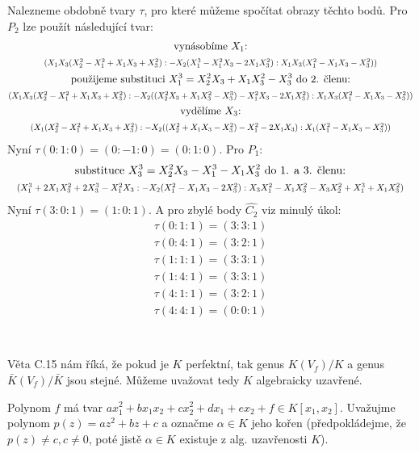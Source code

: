 \documentclass[12pt, a4paper]{article}
\begin{document}
\begin{enumerate}
    Nalezneme obdobně tvary $\tau$, pro které můžeme spočítat obrazy těchto bodů. Pro $P_2$ lze použít následující tvar:
    \begin{gather*}
    \text{vynásobíme $X_1$:}\\
    \scalebox{.8}{$(X_1X_3(X_2^2-X_1^2+X_1X_3+X_3^2) : -X_2(X_1^3-X_1^2X_3-2X_1X_3^2) : X_1X_3(X_1^2-X_1X_3-X_3^2))$}\\
    \text{použijeme substituci $X_1^3 = X_2^2X_3 + X_1X_3^2-X_3^3$ do 2. členu:}\\
    \scalebox{.8}{$(X_1X_3(X_2^2-X_1^2+X_1X_3+X_3^2) : -X_2((X_2^2X_3 + X_1X_3^2-X_3^3)-X_1^2X_3-2X_1X_3^2) : X_1X_3(X_1^2-X_1X_3-X_3^2))$}\\
    \text{vydělíme $X_3$:}\\
    \scalebox{.8}{$(X_1(X_2^2-X_1^2+X_1X_3+X_3^2) : -X_2((X_2^2 + X_1X_3-X_3^2)-X_1^2-2X_1X_3) : X_1(X_1^2-X_1X_3-X_3^2))$}\\
    \end{gather*}
    Nyní $\tau(0:1:0) = (0:-1:0) = (0:1:0)$. Pro $P_1:$
    \begin{gather*}
    \text{substituce $X_3^3 = X_2^2X_3-X_1^3-X_1X_3^2$ do 1. a 3. členu:}\\
    \scalebox{.8}{$(X_1^3+2X_1X_3^2+2X_3^3-X_1^2X_3 : -X_2(X_1^2-X_1X_3-2X_3^2) : X_3X_1^2-X_1X_3^2-X_3X_2^2+X_1^3+X_1X_3^2)$}\\
    \end{gather*}
    Nyní $\tau(3:0:1) = (1:0:1)$. 
    A pro zbylé body $\hat{C_2}$ viz minulý úkol:
    \begin{gather*}
        \tau(0:1:1) = (3:3:1)\\
        \tau(0:4:1) = (3:2:1)\\
        \tau(1:1:1) = (3:3:1)\\
        \tau(1:4:1) = (3:3:1)\\
        \tau(4:1:1) = (3:2:1)\\
        \tau(4:4:1) = (0:0:1)\\
    \end{gather*}
\end{enumerate}

\section{}
Věta C.15 nám říká, že pokud je $K$ perfektní, tak genus $K(V_f)/K$ a genus $\bar{K}(V_f)/\bar{K}$ jsou stejné. Můžeme uvažovat tedy $K$ algebraicky uzavřené. 

Polynom $f$ má tvar $ax_1^2+bx_1x_2+cx_2^2+dx_1+ex_2+f \in K[x_1,x_2]$. Uvažujme polynom $p(z)=az^2+bz+c$ a označme $\alpha \in K$ jeho kořen (předpokládejme, že $p(z) \neq c, c \neq 0$, poté jistě $\alpha \in K$ existuje z alg. uzavřenosti $K$). 
\end{document}
